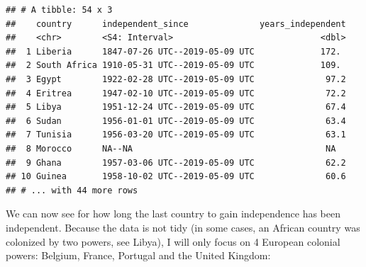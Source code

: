 \documentclass[]{gitbook}
\newenvironment{Shaded}{\begin{snugshade}}{\end{snugshade}}
\newcommand{\DataTypeTok}[1]{\textcolor[rgb]{0.13,0.29,0.53}{#1}}
\newcommand{\KeywordTok}[1]{\textcolor[rgb]{0.13,0.29,0.53}{\textbf{#1}}}
\newcommand{\NormalTok}[1]{#1}
\newcommand{\OperatorTok}[1]{\textcolor[rgb]{0.81,0.36,0.00}{\textbf{#1}}}
\newcommand{\OtherTok}[1]{\textcolor[rgb]{0.56,0.35,0.01}{#1}}
\newcommand{\StringTok}[1]{\textcolor[rgb]{0.31,0.60,0.02}{#1}}
\begin{document}
\begin{verbatim}
## # A tibble: 54 x 3
##    country      independent_since              years_independent
##    <chr>        <S4: Interval>                             <dbl>
##  1 Liberia      1847-07-26 UTC--2019-05-09 UTC             172. 
##  2 South Africa 1910-05-31 UTC--2019-05-09 UTC             109. 
##  3 Egypt        1922-02-28 UTC--2019-05-09 UTC              97.2
##  4 Eritrea      1947-02-10 UTC--2019-05-09 UTC              72.2
##  5 Libya        1951-12-24 UTC--2019-05-09 UTC              67.4
##  6 Sudan        1956-01-01 UTC--2019-05-09 UTC              63.4
##  7 Tunisia      1956-03-20 UTC--2019-05-09 UTC              63.1
##  8 Morocco      NA--NA                                      NA  
##  9 Ghana        1957-03-06 UTC--2019-05-09 UTC              62.2
## 10 Guinea       1958-10-02 UTC--2019-05-09 UTC              60.6
## # ... with 44 more rows
\end{verbatim}

We can now see for how long the last country to gain independence has been independent.
Because the data is not tidy (in some cases, an African country was colonized by two powers,
see Libya), I will only focus on 4 European colonial powers: Belgium, France, Portugal and the United Kingdom:

\begin{Shaded}
\end{Shaded}
\end{document}
